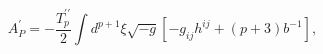 \begin{equation}
A^{\prime}_{P}=-\frac{T^{{\prime}{\prime}}_p}{2}\int d^{p+1}{\xi}
\sqrt{-g}\left[-g_{ij}h^{ij}+(p+3)b^{-1}\right],
\end{equation}


